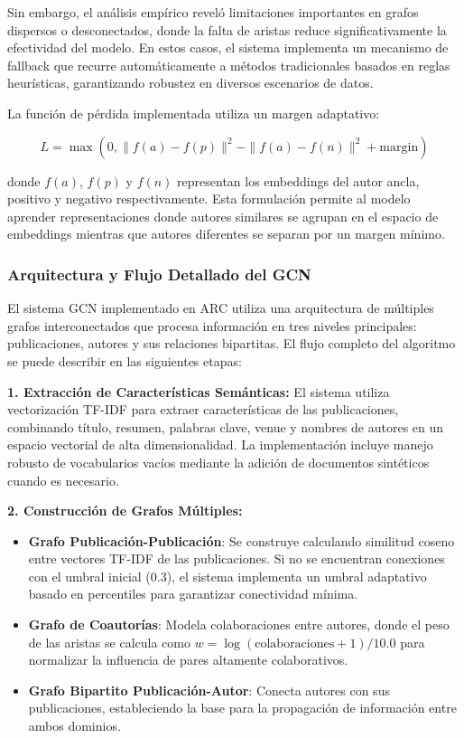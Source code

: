 \documentclass{article}
\begin{document}
Sin embargo, el análisis empírico reveló limitaciones importantes en grafos dispersos o desconectados, donde la falta de aristas reduce significativamente la efectividad del modelo. En estos casos, el sistema implementa un mecanismo de fallback que recurre automáticamente a métodos tradicionales basados en reglas heurísticas, garantizando robustez en diversos escenarios de datos.

La función de pérdida implementada utiliza un margen adaptativo:

\begin{equation}
L = \max(0, \|f(a) - f(p)\|^2 - \|f(a) - f(n)\|^2 + \text{margin})
\end{equation}

donde $f(a)$, $f(p)$ y $f(n)$ representan los embeddings del autor ancla, positivo y negativo respectivamente. Esta formulación permite al modelo aprender representaciones donde autores similares se agrupan en el espacio de embeddings mientras que autores diferentes se separan por un margen mínimo.

\subsubsection{Arquitectura y Flujo Detallado del GCN}

El sistema GCN implementado en ARC utiliza una arquitectura de múltiples grafos interconectados que procesa información en tres niveles principales: publicaciones, autores y sus relaciones bipartitas. El flujo completo del algoritmo se puede describir en las siguientes etapas:

\textbf{1. Extracción de Características Semánticas:}
El sistema utiliza vectorización TF-IDF para extraer características de las publicaciones, combinando título, resumen, palabras clave, venue y nombres de autores en un espacio vectorial de alta dimensionalidad. La implementación incluye manejo robusto de vocabularios vacíos mediante la adición de documentos sintéticos cuando es necesario.

\textbf{2. Construcción de Grafos Múltiples:}
\begin{itemize}[leftmargin=*]
    \item \textbf{Grafo Publicación-Publicación}: Se construye calculando similitud coseno entre vectores TF-IDF de las publicaciones. Si no se encuentran conexiones con el umbral inicial (0.3), el sistema implementa un umbral adaptativo basado en percentiles para garantizar conectividad mínima.
    \item \textbf{Grafo de Coautorías}: Modela colaboraciones entre autores, donde el peso de las aristas se calcula como $w = \log(\text{colaboraciones} + 1) / 10.0$ para normalizar la influencia de pares altamente colaborativos.
    \item \textbf{Grafo Bipartito Publicación-Autor}: Conecta autores con sus publicaciones, estableciendo la base para la propagación de información entre ambos dominios.
\end{itemize}
\end{document}
